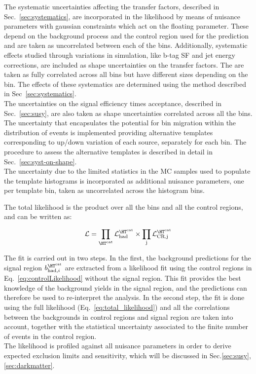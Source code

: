 The systematic uncertainties affecting the transfer factors, described in Sec.~\ref{sec:systematics}, 
are incorporated in the likelihood by means of nuisance parameters with gaussian constraints which act on the floating
parameter. These depend on the background process and the control region used for the prediction and
are taken as uncorrelated between each of the \htcat bins. Additionally, systematic effects studied 
through variations in simulation, like b-tag SF and jet energy corrections, are included as shape uncertainties on the transfer factors. 
The are taken as fully correlated across all bins but have different sizes depending on the bin. The effects 
of these systematics are determined using the method described in Sec~\ref{sec:systematics}. \\
The uncertainties on the signal efficiency times acceptance, described in Sec.~\ref{sec:susy}, 
are also taken as shape uncertainties correlated across all the \htcat bins. 
The uncertainty that encapsulates the potential for bin migration within the \mht distribution of events is implemented 
providing alternative templates corresponding to up/down variation of each source, separately for each \htcat bin. 
The procedure to assess the alternative templates is described in detail in Sec.~\ref{sec:syst-on-shape}. \\
The uncertainty due to the limited statistics in the MC samples used to populate the template histograms is incorporated 
as additional nuisance parameters, one per template bin, taken as uncorrelated across the histogram bins. 

The total likelihood is the product over all the \htcat bins and all the control regions, and can be written as:

\begin{equation}
\label{eq:total_likelihood}
\mathcal{L} = \prod_{\htcat} \mathcal{L}_{\text{had}}^{\htcat} \times \prod_{\text{j}} \mathcal{L}_{\text{CR,j}}^{\htcat}
\end{equation}

The fit is carried out in two steps. 
In the first, the background predictions for the signal region $b^{\htcat}_{\mathrm{had},i}$ are extracted from a likelihood fit 
using the control regions in Eq.~\ref{eq:controlLikelihood} without the signal region. 
This fit provides the best knowledge of the background yields in the signal region, 
and the predictions can therefore be used to re-interpret the analysis. 
In the second step, the fit is done using the full likelihood (Eq.~\ref{eq:total_likelihood}) and all 
the correlations between the backgrounds in control regions and signal region are taken into account, 
together with the statistical uncertainty associated to the finite number of events in the control region. \\
The likelihood is profiled against all nuisance parameters in order to derive expected exclusion limits and sensitivity, 
which will be discussed in Sec.\ref{sec:susy}, \ref{sec:darkmatter}.

